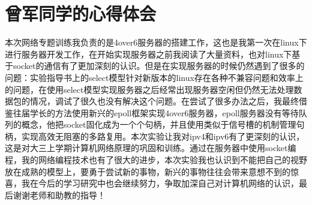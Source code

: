 \section{曾军同学的心得体会}
本次网络专题训练我负责的是4over6服务器的搭建工作，这也是我第一次在linux下进行服务器开发工作，在开始实现服务器之前我阅读了大量资料，也对linux下基于socket的通信有了更加深刻的认识。但是在实现服务器的时候仍然遇到了很多的问题：实验指导书上的select模型针对新版本的linux存在各种不兼容问题和效率上的问题，在使用select模型实现服务器之后经常出现服务器空闲但仍然无法处理数据包的情况，调试了很久也没有解决这个问题。在尝试了很多办法之后，我最终借鉴往届学长的方法使用新兴的epoll框架实现4over6服务器，epoll服务器没有等待队列的概念，他把socket固化成为一个个句柄，并且使用类似于信号槽的机制管理句柄，实现高效无阻塞的多路复用。本次实验让我对ipv4和ipv6有了更深刻的认识，这是对大三上学期计算机网络原理的巩固和训练。通过在服务器中使用socket编程，我的网络编程技术也有了很大的进步，本次实验我也认识到不能把自己的视野放在成熟的模型上，要勇于尝试新的事物，新兴的事物往往会带来意想不到的惊喜，我在今后的学习研究中也会继续努力，争取加深自己对计算机网络的认识，最后谢谢老师和助教的指导！